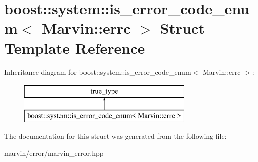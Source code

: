 \hypertarget{structboost_1_1system_1_1is__error__code__enum_3_01_marvin_1_1errc_01_4}{}\section{boost\+:\+:system\+:\+:is\+\_\+error\+\_\+code\+\_\+enum$<$ Marvin\+:\+:errc $>$ Struct Template Reference}
\label{structboost_1_1system_1_1is__error__code__enum_3_01_marvin_1_1errc_01_4}
Inheritance diagram for boost\+:\+:system\+:\+:is\+\_\+error\+\_\+code\+\_\+enum$<$ Marvin\+:\+:errc $>$\+:\begin{figure}[H]
\begin{center}
\leavevmode
\includegraphics[height=2.000000cm]{structboost_1_1system_1_1is__error__code__enum_3_01_marvin_1_1errc_01_4}
\end{center}
\end{figure}


The documentation for this struct was generated from the following file\+:\begin{DoxyCompactItemize}
\item 
marvin/error/marvin\+\_\+error.\+hpp\end{DoxyCompactItemize}
